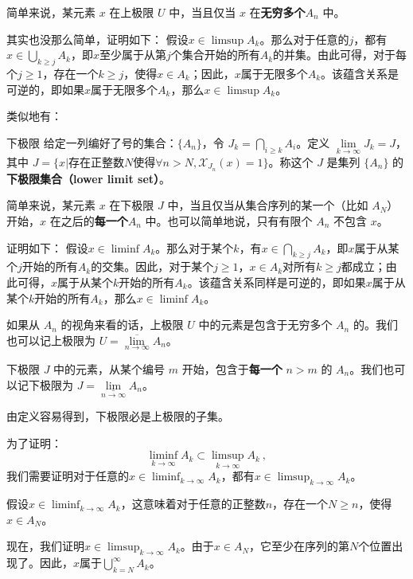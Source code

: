 简单来说，某元素 $x$ 在上极限 $U$ 中，当且仅当 $x$ 在\textbf{无穷多个}$A_n$ 中。

\begin{corollary}{其实也没那么简单，证明如下：}
假设$x\in\limsup A_{k}$。那么对于任意的$j$，都有$x\in\bigcup_{k\geqslant j}A_{k}$，即$x$至少属于从第$j$个集合开始的所有$A_{k}$的并集。由此可得，对于每个$j\geq1$，存在一个$k\geq j$，使得$x\in A_{k}$；因此，$x$属于无限多个$A_{k}$。该蕴含关系是可逆的，即如果$x$属于无限多个$A_{k}$，那么$x\in\limsup A_{k}$。
\end{corollary}

类似地有：

\begin{definition}{下极限}
给定一列编好了号的集合：$\{A_n\}$，令 $J_k=\underset{i\ge k}{\bigcap} A_i$。定义 $\lim\limits_{k\to\infty} J_k=J$，其中 $J=\{x|\text{存在正整数}N\text{使得}\forall n>N, \mathcal{X}_{J_n}(x)=1\}$。称这个 $J$ 是集列 $\{A_n\}$ 的\textbf{下极限集合（lower limit set）}。
\end{definition}

简单来说，某元素 $x$ 在下极限 $J$ 中，当且仅当从集合序列的某一个（比如 $A_N$）开始，$x$ 在之后的\textbf{每一个}$A_n$ 中。也可以简单地说，只有有限个 $A_n$ 不包含 $x$。

\begin{corollary}{证明如下：}
假设$x\in\liminf A_{k}$。那么对于某个$k$，有$x\in\bigcap_{k\geqslant j}A_{k}$，即$x$属于从某个$j$开始的所有$A_{k}$的交集。因此，对于某个$j\geq1$，$x\in A_{k}$对所有$k\geq j$都成立；由此可得，$x$属于从某个$k$开始的所有$A_{k}$。该蕴含关系同样是可逆的，即如果$x$属于从某个$k$开始的所有$A_{k}$，那么$x\in\liminf A_{k}$。
\end{corollary}

如果从 $A_n$ 的视角来看的话，上极限 $U$ 中的元素是包含于无穷多个 $A_n$ 的。我们也可以记上极限为 $U=\underset{n\to \infty}{\overline{\lim}} A_n$。

下极限 $J$ 中的元素，从某个编号 $m$ 开始，包含于\textbf{每一个} $n>m$ 的 $A_n$。我们也可以记下极限为 $J=\underset{n\to \infty}{\underline{\lim}}A_n$。

由定义容易得到，下极限必是上极限的子集。

\begin{corollary}{为了证明：}
\begin{equation}
\liminf_{k\to\infty} A_k \subset \limsup_{k\to\infty} A_k~,
\end{equation}
我们需要证明对于任意的$x \in \liminf_{k\to\infty} A_k$，都有$x \in \limsup_{k\to\infty} A_k$。

假设$x \in \liminf_{k\to\infty} A_k$，这意味着对于任意的正整数$n$，存在一个$N \geq n$，使得$x \in A_N$。

现在，我们证明$x \in \limsup_{k\to\infty} A_k$。由于$x \in A_N$，它至少在序列的第$N$个位置出现了。因此，$x$属于$\bigcup_{k=N}^{\infty} A_k$。
\end{corollary}
